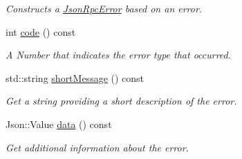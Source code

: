 \begin{DoxyCompactItemize}
\begin{DoxyCompactList}\small\item\em Constructs a \hyperlink{classdg_1_1deepcore_1_1network_1_1_json_rpc_error}{Json\+Rpc\+Error} based on an error. \end{DoxyCompactList}\item 
int \hyperlink{group___network_module_gab5f760ae09f901ed94e08ea1c0d26e50}{code} () const 
\begin{DoxyCompactList}\small\item\em A Number that indicates the error type that occurred. \end{DoxyCompactList}\item 
std\+::string \hyperlink{group___network_module_gab4cfbb46ab5f2ce706d08b5daf106263}{short\+Message} () const 
\begin{DoxyCompactList}\small\item\em Get a string providing a short description of the error. \end{DoxyCompactList}\item 
Json\+::\+Value \hyperlink{group___network_module_ga30e099cc04ea022587d643d2c93bb0e9}{data} () const 
\begin{DoxyCompactList}\small\item\em Get additional information about the error. \end{DoxyCompactList}\end{DoxyCompactItemize}
